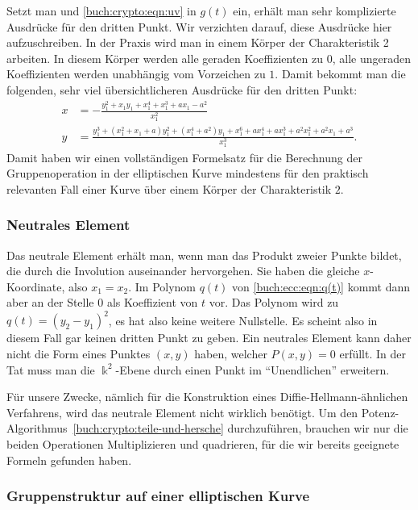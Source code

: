 Setzt man
\label{buch:crypto:eqn:t}
und
\eqref{buch:crypto:eqn:uv}
in $g(t)$ ein, erhält man sehr komplizierte Ausdrücke für den dritten Punkt.
Wir verzichten darauf, diese Ausdrücke hier aufzuschreiben.
In der Praxis wird man in einem Körper der Charakteristik 2 arbeiten.
In diesem Körper werden alle geraden Koeffizienten zu $0$, alle ungeraden
Koeffizienten werden unabhängig vom Vorzeichen zu $1$.
Damit bekommt man die folgenden, sehr viel übersichtlicheren Ausdrücke
für den dritten Punkt:
\begin{equation}
\begin{aligned}
x
&=
-\frac{
y_1^2+x_1y_1+x_1^4+x_1^3+ax_1-a^2
 }{
x_1^2
}
\\
y
&=
\frac{
y_1^3+(x_1^2+x_1+a)y_1^2+(x_1^4 +a^2)y_1+x_1^6+ax_1^4+ax_1^3+a^2x_1^2+a^2x_1+a^3
}{
 x_1^3
}.
\end{aligned}
\label{buch:crypto:eqn:tangentechar2}
\end{equation}
Damit haben wir einen vollständigen Formelsatz für die Berechnung der
Gruppenoperation in der elliptischen Kurve mindestens für den praktisch
relevanten Fall einer Kurve über einem Körper der Charakteristik $2$.

\subsubsection{Neutrales Element}
Das neutrale Element erhält man, wenn man das Produkt zweier Punkte
bildet, die durch die Involution auseinander hervorgehen.
Sie haben die gleiche $x$-Koordinate, also $x_1=x_2$.
Im Polynom $q(t)$ von \eqref{buch:ecc:eqn:q(t)} kommt dann aber an
der Stelle $0$ als Koeffizient von $t$ vor.
Das Polynom wird zu $q(t) = (y_2-y_1)^2$, es hat also keine weitere
Nullstelle.
Es scheint also in diesem Fall gar keinen dritten Punkt zu geben.
Ein neutrales Element kann daher nicht die Form eines Punktes $(x,y)$
haben, welcher $P(x,y)=0$ erfüllt.
In der Tat muss man die $\Bbbk^2$-Ebene durch einen Punkt im ``Unendlichen''
erweitern.

Für unsere Zwecke, nämlich für die Konstruktion eines
Diffie-Hellmann-ähnlichen Verfahrens, wird das neutrale Element
nicht wirklich benötigt.
Um den Potenz-Algorithmus~\ref{buch:crypto:teile-und-hersche}
durchzuführen, brauchen wir nur die beiden Operationen
Multiplizieren und quadrieren, für die wir bereits
geeignete Formeln gefunden haben.

\subsubsection{Gruppenstruktur auf einer elliptischen Kurve}

